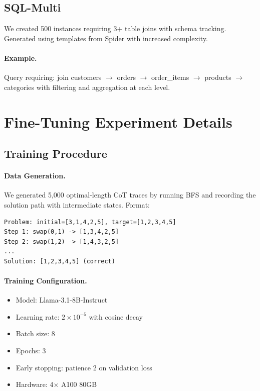 \documentclass{article}
\theoremstyle{plain}
\theoremstyle{definition}
\theoremstyle{remark}
\begin{document}
\subsection{SQL-Multi}

We created 500 instances requiring 3+ table joins with schema tracking. Generated using templates from Spider \citep{yu2018spider} with increased complexity.

\paragraph{Example.} Query requiring: join customers $\rightarrow$ orders $\rightarrow$ order\_items $\rightarrow$ products $\rightarrow$ categories with filtering and aggregation at each level.


\section{Fine-Tuning Experiment Details}
\label{app:finetune}

\subsection{Training Procedure}

\paragraph{Data Generation.} We generated 5,000 optimal-length CoT traces by running BFS and recording the solution path with intermediate states. Format:
\begin{verbatim}
Problem: initial=[3,1,4,2,5], target=[1,2,3,4,5]
Step 1: swap(0,1) -> [1,3,4,2,5]
Step 2: swap(1,2) -> [1,4,3,2,5]
...
Solution: [1,2,3,4,5] (correct)
\end{verbatim}

\paragraph{Training Configuration.}
\begin{itemize}
\item Model: Llama-3.1-8B-Instruct
\item Learning rate: $2 \times 10^{-5}$ with cosine decay
\item Batch size: 8
\item Epochs: 3
\item Early stopping: patience 2 on validation loss
\item Hardware: 4$\times$ A100 80GB
\end{itemize}
\end{document}
